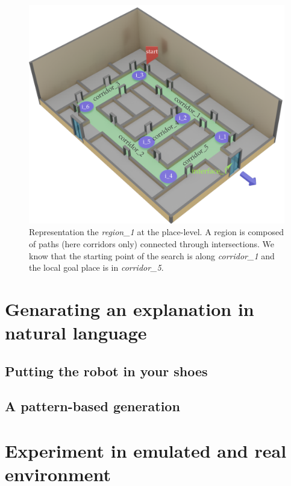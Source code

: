 \begin{figure}[ht!]
\centering
\includegraphics[scale=0.28]{figures/chapter3/region1.png}
\caption{\label{fig:chap3_region1} Representation the \textit{region\_1} at the place-level. A region is composed of paths (here corridors only) connected through intersections. We know that the starting point of the search is along \textit{corridor\_1} and the local goal place is in \textit{corridor\_5}. }
\end{figure}

\section{Genarating an explanation in natural language}

\subsection{Putting the robot in your shoes}

\subsection{A pattern-based generation}

\section{Experiment in emulated and real environment}



